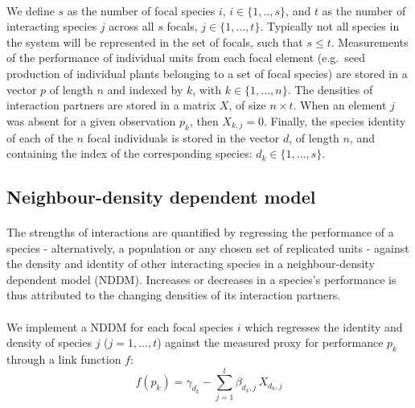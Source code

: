 \documentclass[a4,12pt]{article}
\begin{document}
    \paragraph{}
    We define $s$ as the number of focal species $i$, $i \in \{ 1, .., s \}$, and $t$ as the number of interacting species $j$ across all $s$ focals, $j \in \{1, ..., t \}$. Typically not all species in the system will be represented in the set of focals, such that $s \le t$. Measurements of the performance of individual units from each focal element (e.g.\ seed production of individual plants belonging to a set of focal species) are stored in a vector $p$ of length $n$ and indexed by $k$, with $k \in \{1, ..., n \}$. The densities of interaction partners are stored in a matrix $X$, of size $n \times t$. When an element $j$ was absent for a given observation $p_k$, then $X_{k,j} = 0$. Finally, the species identity of each of the $n$ focal individuals is stored in the vector $d$, of length $n$, and containing the index of the corresponding species: $d_k \in \{1, ..., s \}$.

    \subsection{Neighbour-density dependent model}
    \label{meth:nddm}    

        \paragraph{}
        The strengths of interactions are quantified by regressing the performance of a species  - alternatively, a population or any chosen set of replicated units - against the density and identity of other interacting species in a neighbour-density dependent model (NDDM).  Increases or decreases in a species's performance is thus attributed to the changing densities of its interaction partners. 

        \paragraph{}
        We implement a NDDM for each focal species $i$ which regresses the identity and density of species $j$ ($j = 1, ..., t$) against the measured proxy for performance $p_{k}$ through a link function $f$:
        \begin{equation}
        f(p_{k}) = \gamma_{d_k} - \sum_{j=1}^{t} \beta_{d_k,j} \, X_{d_k,j}
        \label{nddm}
        \end{equation}
\end{document}
